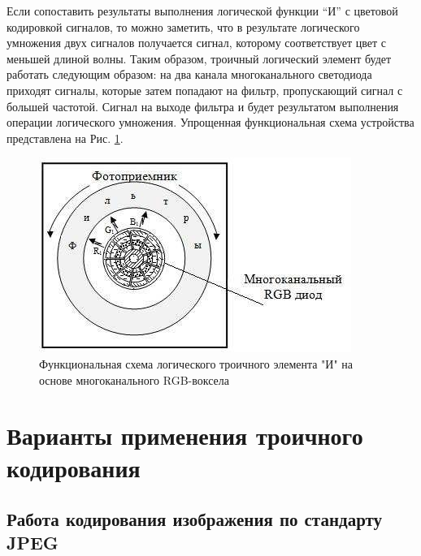 \documentclass[10pt]{beamer}
\begin{document}
\begin{frame}[shrink=20,fragile]
\transdissolve[duration=0.2]
\begin{block}{}
	Если сопоставить результаты выполнения логической функции “И” с цветовой кодировкой сигналов, то можно заметить, что в результате логического умножения двух сигналов получается сигнал, которому соответствует цвет с меньшей длиной волны. Таким образом, троичный логический элемент будет работать следующим образом: на два канала многоканального светодиода приходят сигналы, которые затем попадают на фильтр, пропускающий сигнал с большей частотой. Сигнал на выходе фильтра и будет результатом выполнения операции логического умножения. Упрощенная функциональная схема устройства представлена на Рис. \ref{fig3}.

\begin{figure}
\label{fig3}
\caption{Функциональная схема логического троичного элемента "И" на основе многоканального RGB-воксела}
\includegraphics[scale=0.85]{pics/3.jpeg}
\end{figure}
\end{block}   

\end{frame}

\section{Варианты применения троичного кодирования}
\subsection{Работа кодирования изображения по стандарту JPEG}
\end{document}
